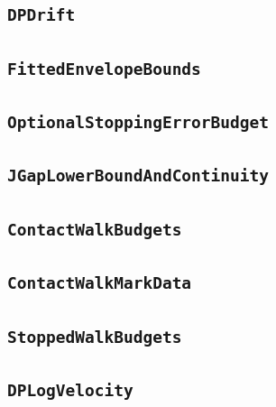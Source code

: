 \documentclass[11pt]{amsart}
\theoremstyle{definition}
\begin{document}
\subsection{\texorpdfstring{\texttt{DPDrift}}{DPDrift}}\label{node:DPDrift}


\subsection{\texorpdfstring{\texttt{FittedEnvelopeBounds}}{FittedEnvelopeBounds}}\label{node:FittedEnvelopeBounds}


\subsection{\texorpdfstring{\texttt{OptionalStoppingErrorBudget}}{OptionalStoppingErrorBudget}}\label{node:OptionalStoppingErrorBudget}


\subsection{\texorpdfstring{\texttt{JGapLowerBoundAndContinuity}}{JGapLowerBoundAndContinuity}}\label{node:JGapLowerBoundAndContinuity}


\subsection{\texorpdfstring{\texttt{ContactWalkBudgets}}{ContactWalkBudgets}}\label{node:ContactWalkBudgets}


\subsection{\texorpdfstring{\texttt{ContactWalkMarkData}}{ContactWalkMarkData}}\label{node:ContactWalkMarkData}


\subsection{\texorpdfstring{\texttt{StoppedWalkBudgets}}{StoppedWalkBudgets}}\label{node:StoppedWalkBudgets}


\subsection{\texorpdfstring{\texttt{DPLogVelocity}}{DPLogVelocity}}\label{node:DPLogVelocity}

\end{document}
